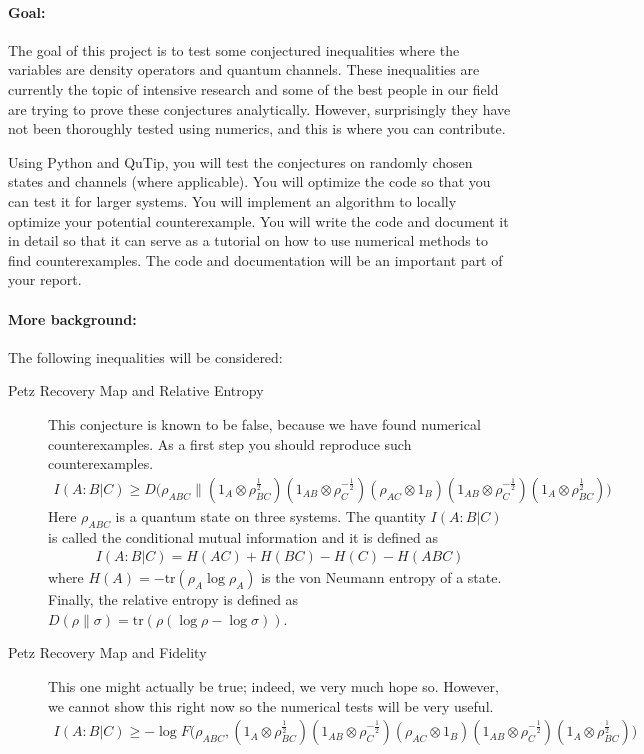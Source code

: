 \documentclass[aps,pra,onecolumn,nofootinbib,superscriptaddress,tightenlines,
notitlepage,12pt]{revtex4-1}
\newcommand{\tr}{\mathrm{tr}}
\begin{document}
\paragraph*{Goal:}
The goal of this project is to test some conjectured inequalities where the variables are density operators and quantum channels. These inequalities are currently the topic of intensive research and some of the best people in our field are trying to prove these conjectures analytically. However, surprisingly they have not been thoroughly tested using numerics, and this is where you can contribute. 

Using Python and QuTip, you will test the conjectures on randomly chosen states and channels (where applicable). You will optimize the code so that you can test it for larger systems. You will implement an algorithm to locally optimize your potential counterexample. You will write the code and document it in detail so that it can serve as a tutorial on how to use numerical methods to find counterexamples. The code and documentation will be an important part of your report.

\paragraph*{More background:}
The following inequalities will be considered:
\begin{description}
  \item[Petz Recovery Map and Relative Entropy]
    This conjecture is known to be false, because we have found numerical counterexamples. As a first step you should reproduce such counterexamples.
   \begin{align}
     I(A:B|C) \geq D \Big(\rho_{ABC} \Big\| (1_A \otimes \rho_{BC}^{\frac12})  (1_{AB} \otimes \rho_{C}^{-\frac12}) (\rho_{AC} \otimes 1_B) (1_{AB} \otimes \rho_{C}^{-\frac12} ) (1_A \otimes \rho_{BC}^{\frac12}) \Big)
   \end{align}
   Here $\rho_{ABC}$ is a quantum state on three systems. The quantity $I(A:B|C)$ is called the conditional mutual information and it is defined as
   \begin{align}
     I(A:B|C) = H(AC) + H(BC) - H(C) - H(ABC)
   \end{align}
   where $H(A) = -\tr (\rho_A \log \rho_A)$ is the von Neumann entropy of a state. Finally, the relative entropy is defined as $D(\rho\|\sigma) = \tr(\rho (\log \rho - \log \sigma))$.

  \item[Petz Recovery Map and Fidelity] This one might actually be true; indeed, we very much hope so. However, we cannot show this right now so the numerical tests will be very useful.
  \begin{align}
I(A:B|C) \geq -\log F \Big(\rho_{ABC} , (1_A \otimes \rho_{BC}^{\frac12})  (1_{AB} \otimes \rho_{C}^{-\frac12}) (\rho_{AC} \otimes 1_B) (1_{AB} \otimes \rho_{C}^{-\frac12} ) (1_A \otimes \rho_{BC}^{\frac12}) \Big)
  \end{align}
     
\end{description}
\end{document}
